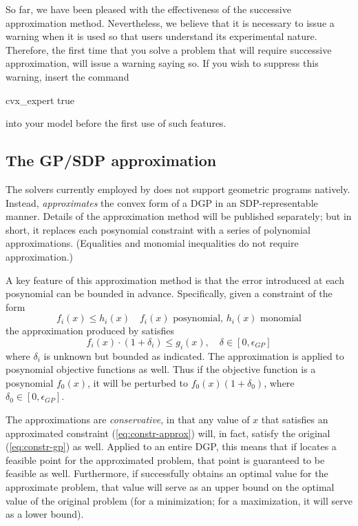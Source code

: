 \documentclass[12pt]{article}
\begin{document}
So far, we have been pleased with the effectiveness of the successive 
approximation method. Nevertheless, we believe that it is necessary to issue a warning
when it is used so that users understand its experimental nature. Therefore,
the first time that you solve a problem that will require successive approximation,
\cvx will issue a warning saying so. If you wish to suppress this
warning, insert the command
\begin{code}
cvx_expert true
\end{code}
into your model before the first use of such features.

\iffalse
\subsection{The GP/SDP approximation}
\label{sec:gp-approx}

The solvers currently employed by \cvx does not support geometric programs natively.
Instead, \cvx \emph{approximates} the convex form of a DGP in an SDP-representable
manner. Details of the approximation method will be published separately; but in short,
it replaces each posynomial constraint with a series of polynomial
approximations. (Equalities and monomial inequalities do not require approximation.)

A key feature of this approximation method is that the error introduced at
each posynomial can be bounded in advance. Specifically,
given a constraint of the form
\begin{equation}
	\label{eq:constr-gp}
	f_i(x) \leq h_i(x) \quad f_i(x)\text{ posynomial, }h_i(x)\text{ monomial}
\end{equation}
the approximation produced by \cvx satisfies
\begin{equation}
	\label{eq:constr-approx}
	f_i(x) \cdot ( 1 + \delta_i ) \leq g_i(x), \quad \delta\in[0,\epsilon_{GP}]
\end{equation}
where $\delta_i$ is unknown but bounded as indicated.
The approximation is applied to posynomial objective functions as well. Thus
if the objective function is a posynomial $f_0(x)$, it will be perturbed to
$f_0(x)(1+\delta_0)$, where $\delta_0\in[0,\epsilon_{GP}]$. 

The approximations are \emph{conservative}, in that any value of $x$ that
satisfies an approximated constraint (\ref{eq:constr-approx})
will, in fact, satisfy the original (\ref{eq:constr-gp}) as well.
Applied to an entire DGP, this means that if \cvx locates a feasible point for
the approximated problem, that point is guaranteed to be feasible as well.
Furthermore, if \cvx successfully obtains an optimal value for the approximate
problem, that value will serve as an upper bound on the optimal value of
the original problem (for a minimization; for a maximization, it will serve
as a lower bound). 
\end{document}
